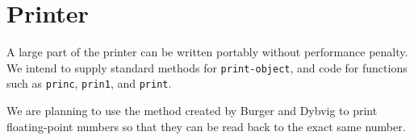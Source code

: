 \chapter{Printer}

A large part of the printer can be written portably without
performance penalty.  We intend to supply standard methods for
\texttt{print-object}, and code for functions such as \texttt{princ},
\texttt{prin1}, and \texttt{print}. 

We are planning to use the method created by Burger and Dybvig to
print floating-point numbers so that they can be read back to the
exact same number. 
